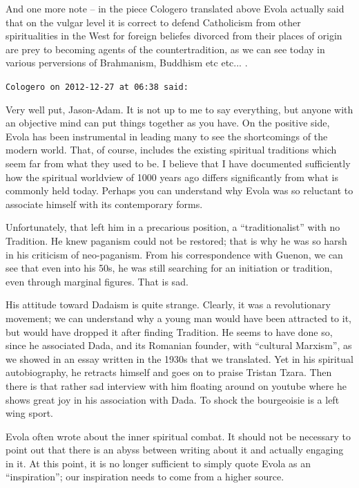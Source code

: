 \begin{footnotesize}
\begin{sffamily}
And one more note -- in the piece Cologero translated above Evola actually said that on the vulgar level it is correct to defend Catholicism from other spiritualities in the West for foreign beliefes divorced from their places of origin are prey to becoming agents of the countertradition, as we can see today in various perversions of Brahmanism, Buddhism etc etc... .

\hfill

\texttt{Cologero on 2012-12-27 at 06:38 said:}

Very well put, Jason-Adam. It is not up to me to say everything, but anyone with an objective mind can put things together as you have. On the positive side, Evola has been instrumental in leading many to see the shortcomings of the modern world. That, of course, includes the existing spiritual traditions which seem far from what they used to be. I believe that I have documented sufficiently how the spiritual worldview of 1000 years ago differs significantly from what is commonly held today. Perhaps you can understand why Evola was so reluctant to associate himself with its contemporary forms.

Unfortunately, that left him in a precarious position, a ``traditionalist'' with no Tradition. He knew paganism could not be restored; that is why he was so harsh in his criticism of neo-paganism. From his correspondence with Guenon, we can see that even into his 50s, he was still searching for an initiation or tradition, even through marginal figures. That is sad.

His attitude toward Dadaism is quite strange. Clearly, it was a revolutionary movement; we can understand why a young man would have been attracted to it, but would have dropped it after finding Tradition. He seems to have done so, since he associated Dada, and its Romanian founder, with ``cultural Marxism'', as we showed in an essay written in the 1930s that we translated. Yet in his spiritual autobiography, he retracts himself and goes on to praise Tristan Tzara. Then there is that rather sad interview with him floating around on youtube where he shows great joy in his association with Dada. To shock the bourgeoisie is a left wing sport.

Evola often wrote about the inner spiritual combat. It should not be necessary to point out that there is an abyss between writing about it and actually engaging in it. At this point, it is no longer sufficient to simply quote Evola as an ``inspiration''; our inspiration needs to come from a higher source.


\end{sffamily}
\end{footnotesize}
